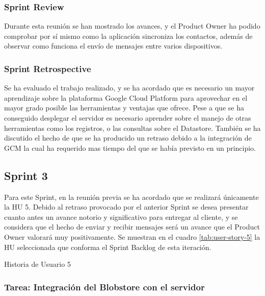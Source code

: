 

\subsubsection{Sprint Review}

Durante esta reunión se han mostrado los avances, y el Product Owner ha podido comprobar por sí mismo como la aplicación sincroniza los contactos, además de observar como funciona el envío de mensajes entre varios dispositivos.

\subsubsection{Sprint Retrospective}

Se ha evaluado el trabajo realizado, y se ha acordado que es necesario un mayor aprendizaje sobre la plataforma Google Cloud Platform para aprovechar en el mayor grado posible las herramientas y ventajas que ofrece. Pese a que se ha conseguido desplegar el servidor es necesario aprender sobre el manejo de otras herramientas como los registros, o las consultas sobre el Datastore. También se ha discutido el hecho de que se ha producido un retraso debido a la integración de \ac{GCM} la cual ha requerido mas tiempo del que se había previsto en un principio.


\subsection{Sprint 3}

Para este Sprint, en la reunión previa se ha acordado que se realizará únicamente la \ac{HU} 5. Debido al retraso provocado por el anterior Sprint se desea presentar cuanto antes un avance notorio y significativo para entregar al cliente, y se considera que el hecho de enviar y recibir mensajes será un avance que el Product Owner valorará muy positivamente. Se muestran en el cuadro \ref{tab:user-story-5} la \ac{HU} seleccionada que conforma el Sprint Backlog  de esta iteración.

\begin{table}[hp]
  \centering
  {\small
  
  }
  \caption{Historia de Usuario 5}
  \label{tab:user-story-5}
\end{table}


\subsubsection{Tarea: Integración del Blobstore con el servidor}

